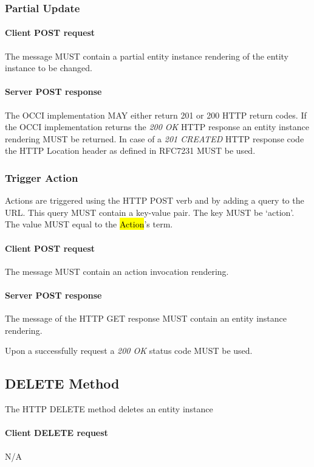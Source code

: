 \documentclass[10pt,a4paper]{article}
\begin{document}
\subsubsection{Partial Update}

\paragraph{Client POST request}
The message MUST contain a partial entity instance rendering of the entity instance to be changed.

\paragraph{Server POST response}
The OCCI implementation MAY either return 201 or 200 HTTP return codes. If the OCCI implementation
returns the \emph{200 OK} HTTP response an entity instance rendering MUST be returned.
In case of a \emph{201 CREATED} HTTP response code the HTTP Location header as defined in RFC7231 \cite{rfc7231} MUST be used.

\subsubsection{Trigger Action}
Actions are triggered using the HTTP POST verb and by adding a query to the URL. This query MUST contain a key-value pair. The key MUST be `action'. The value MUST equal to the \hl{Action}'s term.

\paragraph{Client POST request}
The message MUST contain an action invocation rendering.

\paragraph{Server POST response}
The message of the HTTP GET response MUST contain an entity instance rendering.

Upon a successfully request a \emph{200 OK} status code MUST be used.

\subsection{DELETE Method}
The HTTP DELETE method deletes an entity instance

\paragraph{Client DELETE request}
N/A
\end{document}
